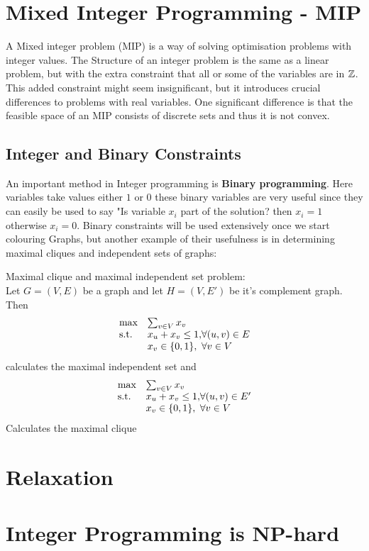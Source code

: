 \section{Mixed Integer Programming - MIP}
A Mixed integer problem (MIP) is a way of solving optimisation problems with integer values. The Structure of an integer problem is the same as a linear problem, but with the extra constraint that all or some of the variables are in $\mathbb{Z}$. This added constraint might seem insignificant, but it introduces crucial differences to problems with real variables. One significant difference is that the feasible space of an MIP consists of discrete sets and thus it is not convex.
\subsection{Integer and Binary Constraints}
An important method in Integer programming is \textbf{Binary programming}. Here variables take values either $1$ or $0$ these binary variables are very useful since they can easily be used to say "Is variable $x_i$ part of the solution? then $x_i = 1$ otherwise $x_i = 0$. Binary constraints will be used extensively once we start colouring Graphs, but another example of their usefulness is in determining maximal cliques and independent sets of graphs:
\begin{example}\label{clique}
Maximal clique and maximal independent set problem:\\
Let $G=(V,E)$ be a graph and let $H=(V,E')$ be it's complement graph. Then
\begin{align}
\begin{array}{ll@{}ll}
\text{max} &\sum_{v\in V} x_v&\\
\text{s.t.} &x_u + x_v \leq 1,& \forall (u,v) \in E\\
&x_v\in\{0,1\},& \forall v \in V\\
\end{array}
\end{align}
calculates the maximal independent set and
\begin{align}
\begin{array}{ll@{}ll}
\text{max} &\sum_{v\in V} x_v&\\
\text{s.t.} &x_u + x_v \leq 1,& \forall (u,v) \in E'\\
&x_v\in\{0,1\},& \forall v \in V\\
\end{array}
\end{align}
Calculates the maximal clique
\end{example}
\section{Relaxation}
\section{Integer Programming is NP-hard}
